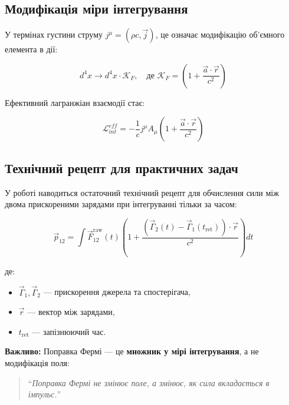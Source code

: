 \documentclass[12pt, a4paper]{article}
\begin{document}
\subsection{Модифікація міри інтегрування}

У термінах густини струму $j^\mu = (\rho c, \vec{j})$, це означає модифікацію об'ємного елемента в дії:

\begin{equation}
d^4x \longrightarrow d^4x \cdot \mathcal{K}_F, \quad \text{де } \mathcal{K}_F = \left( 1 + \frac{\vec{a} \cdot \vec{r}}{c^2} \right)
\label{eq:measure_modification}
\end{equation}

Ефективний лагранжіан взаємодії стає:

\begin{equation}
\mathcal{L}_{int}^{eff} = -\frac{1}{c} j^\mu A_\mu \left( 1 + \frac{\vec{a} \cdot \vec{r}}{c^2} \right)
\label{eq:lagrangian_eff}
\end{equation}

\subsection{Технічний рецепт для практичних задач}

У роботі \cite{FermiSolution} наводиться остаточний технічний рецепт для обчислення сили між двома прискореними зарядами при інтегруванні тільки за часом:

\begin{equation}
\vec{p}_{12} = \int \vec{F}_{12}^{\text{raw}}(t) \left( 1 + \frac{(\vec{\Gamma}_2(t) - \vec{\Gamma}_1(t_{\text{ret}})) \cdot \vec{r}}{c^2} \right) dt
\label{eq:fermi_technical}
\end{equation}

де:
\begin{itemize}
    \item $\vec{\Gamma}_1, \vec{\Gamma}_2$ --- прискорення джерела та спостерігача,
    \item $\vec{r}$ --- вектор між зарядами,
    \item $t_{\text{ret}}$ --- запізнюючий час.
\end{itemize}

\textbf{Важливо:} Поправка Фермі --- це \textbf{множник у мірі інтегрування}, а не модифікація поля:

\begin{quote}
``\textit{Поправка Фермі не змінює поле, а змінює, як сила вкладається в імпульс.}'' \cite{FermiSolution}
\end{quote}
\end{document}
